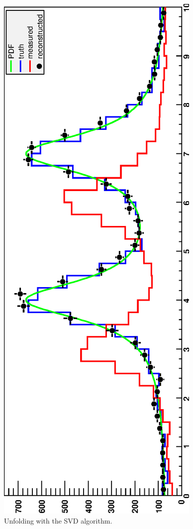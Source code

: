 \documentclass{desyproc}
\begin{document}
\begin{figure}[hb]
\centerline{\includegraphics[angle=-90,width=\textwidth]{adye_tim.svd2.eps}}
\caption{Unfolding with the SVD algorithm.}\label{Fig:adye:svd-example}
\end{figure}
\end{document}
